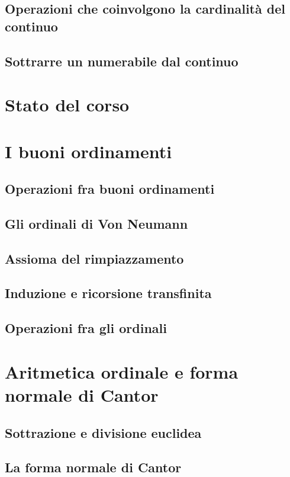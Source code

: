 \documentclass[11pt]{scrartcl}
\begin{document}
\subsection{Operazioni che coinvolgono la cardinalità del continuo}
\newpage
\subsection{Sottrarre un numerabile dal continuo}




\newpage
\section{Stato del corso}




\newpage
\section{I buoni ordinamenti}
\subsection{Operazioni fra buoni ordinamenti}
\newpage
\subsection{Gli ordinali di Von Neumann}
\newpage
\subsection{Assioma del rimpiazzamento}
\newpage
\subsection{Induzione e ricorsione transfinita}
\newpage
\subsection{Operazioni fra gli ordinali}




\newpage
\section{Aritmetica ordinale e forma normale di Cantor}
\subsection{Sottrazione e divisione euclidea}
\newpage
\subsection{La forma normale di Cantor}
\newpage
\end{document}
